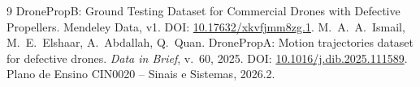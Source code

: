 \documentclass[10pt,a4paper]{article}
\begin{document}
\begin{thebibliography}{9}
 DronePropB: Ground Testing Dataset for Commercial Drones with Defective Propellers. Mendeley Data, v1. DOI: \href{https://doi.org/10.17632/xkvfjmm8zg.1}{10.17632/xkvfjmm8zg.1}.
 M.~A.~A.~Ismail, M.~E.~Elshaar, A.~Abdallah, Q.~Quan. DronePropA: Motion trajectories dataset for defective drones. \emph{Data in Brief}, v.~60, 2025. DOI: \href{https://doi.org/10.1016/j.dib.2025.111589}{10.1016/j.dib.2025.111589}.
 Plano de Ensino CIN0020 -- Sinais e Sistemas, 2026.2.
\end{thebibliography}
\end{document}
